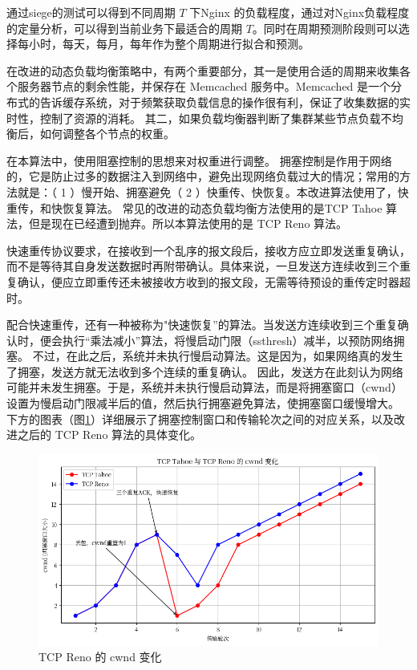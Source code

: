通过siege的测试可以得到不同周期 $T$ 下Nginx 的负载程度，通过对Nginx负载程度的定量分析，可以得到当前业务下最适合的周期 $T$。同时在周期预测阶段则可以选择每小时，每天，每月，每年作为整个周期进行拟合和预测。

在改进的动态负载均衡策略中，有两个重要部分，其一是使用合适的周期来收集各个服务器节点的剩余性能，并保存在 Memcached 服务中。Memcached 是一个分布式的告诉缓存系统，对于频繁获取负载信息的操作很有利，保证了收集数据的实时性，控制了资源的消耗。
其二，如果负载均衡器判断了集群某些节点负载不均衡后，如何调整各个节点的权重。

在本算法中，使用阻塞控制的思想来对权重进行调整。
拥塞控制是作用于网络的，它是防止过多的数据注入到网络中，避免出现网络负载过大的情况；常用的方法就是：（ 1 ）慢开始、拥塞避免（ 2 ）快重传、快恢复。本改进算法使用了，快重传，和快恢复算法。
常见的改进的动态负载均衡方法使用的是TCP Tahoe 算法，但是现在已经遭到抛弃。所以本算法使用的是 TCP Reno 算法。

快速重传协议要求，在接收到一个乱序的报文段后，接收方应立即发送重复确认，而不是等待其自身发送数据时再附带确认。具体来说，一旦发送方连续收到三个重复确认，便应立即重传还未被接收方收到的报文段，无需等待预设的重传定时器超时。

配合快速重传，还有一种被称为"快速恢复”的算法。当发送方连续收到三个重复确认时，便会执行“乘法减小”算法，将慢启动门限（ssthresh）减半，以预防网络拥塞。
不过，在此之后，系统并未执行慢启动算法。这是因为，如果网络真的发生了拥塞，发送方就无法收到多个连续的重复确认。
因此，发送方在此刻认为网络可能并未发生拥塞。于是，系统并未执行慢启动算法，而是将拥塞窗口（cwnd）设置为慢启动门限减半后的值，然后执行拥塞避免算法，使拥塞窗口缓慢增大。
下方的图表（图\ref{tcp_reno}）详细展示了拥塞控制窗口和传输轮次之间的对应关系，以及改进之后的 TCP Reno 算法的具体变化。

\begin{figure}[htbp]
	\centering
	\includegraphics[width=\textwidth]{figures/tcp_reno.png}
	\caption{TCP Reno 的 cwnd 变化}
	\label{tcp_reno}
\end{figure}


